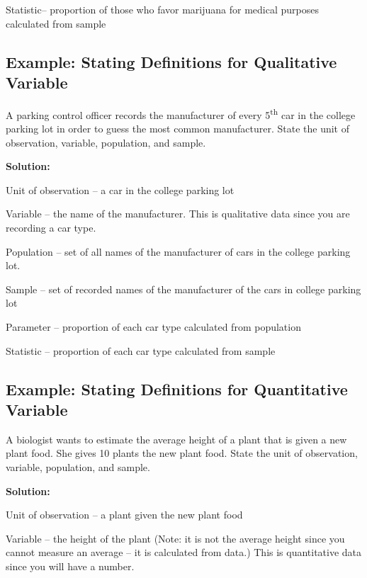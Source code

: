 \documentclass[]{book}
\begin{document}
Statistic-- proportion of those who favor marijuana for medical purposes calculated from sample

\hypertarget{example-stating-definitions-for-qualitative-variable-1}{%
\subsection{Example: Stating Definitions for Qualitative Variable}\label{example-stating-definitions-for-qualitative-variable-1}}

A parking control officer records the manufacturer of every 5\textsuperscript{th} car in the college parking lot in order to guess the most common manufacturer. State the unit of observation, variable, population, and sample.

\textbf{Solution:}

Unit of observation -- a car in the college parking lot

Variable -- the name of the manufacturer. This is qualitative data since you are recording a car type.

Population -- set of all names of the manufacturer of cars in the college parking lot.

Sample -- set of recorded names of the manufacturer of the cars in college parking lot

Parameter -- proportion of each car type calculated from population

Statistic -- proportion of each car type calculated from sample

\hypertarget{example-stating-definitions-for-quantitative-variable}{%
\subsection{Example: Stating Definitions for Quantitative Variable}\label{example-stating-definitions-for-quantitative-variable}}

A biologist wants to estimate the average height of a plant that is given a new plant food. She gives 10 plants the new plant food. State the unit of observation, variable, population, and sample.

\textbf{Solution:}

Unit of observation -- a plant given the new plant food

Variable -- the height of the plant (Note: it is not the average height since you cannot measure an average -- it is calculated from data.) This is quantitative data since you will have a number.
\end{document}
